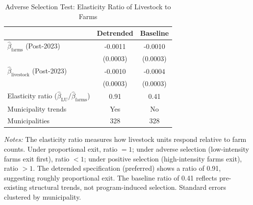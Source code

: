 \begin{table}[htbp]
\centering
\begin{threeparttable}
\caption{Adverse Selection Test: Elasticity Ratio of Livestock to Farms}
\label{tab:selection}
\begin{tabular}{lcc}
\toprule
 & Detrended & Baseline \\
\midrule
$\hat{\beta}_{\text{farms}}$ (Post-2023) & -0.0011 & -0.0010 \\
 & (0.0003) & (0.0003) \\
\addlinespace
$\hat{\beta}_{\text{livestock}}$ (Post-2023) & -0.0010 & -0.0004 \\
 & (0.0003) & (0.0003) \\
\addlinespace
Elasticity ratio ($\hat{\beta}_{\text{LU}} / \hat{\beta}_{\text{farms}}$) & 0.91 & 0.41 \\
\midrule
Municipality trends & Yes & No \\
Municipalities & 328 & 328 \\
\bottomrule
\end{tabular}
\begin{tablenotes}
\item \textit{Notes:} The elasticity ratio measures how livestock units respond relative to farm counts. Under proportional exit, ratio $= 1$; under adverse selection (low-intensity farms exit first), ratio $< 1$; under positive selection (high-intensity farms exit), ratio $> 1$. The detrended specification (preferred) shows a ratio of 0.91, suggesting roughly proportional exit. The baseline ratio of 0.41 reflects pre-existing structural trends, not program-induced selection. Standard errors clustered by municipality.
\end{tablenotes}
\end{threeparttable}
\end{table}
